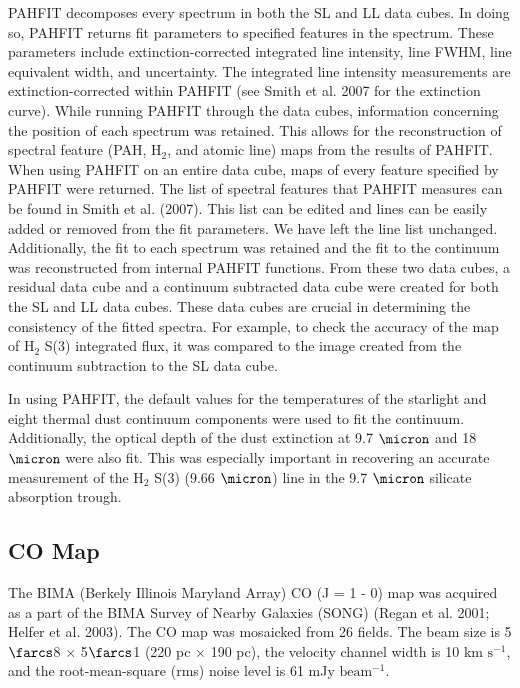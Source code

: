 \documentclass[manuscript]{aastex}
\begin{document}
PAHFIT decomposes every spectrum in both the SL and LL data cubes.  In doing so, PAHFIT returns fit parameters to specified features in the spectrum.  These parameters include extinction-corrected integrated line intensity, line FWHM, line equivalent width, and uncertainty.  The integrated line intensity measurements are extinction-corrected within PAHFIT (see Smith et al. 2007 for the extinction curve).   While running PAHFIT through the data cubes, information concerning the position of each spectrum was retained.  This allows for the reconstruction of spectral feature (PAH, $\mathrm{H_2}$, and atomic line) maps from the results of PAHFIT.  When using PAHFIT on an entire data cube, maps of every feature specified by PAHFIT were returned.  The list of spectral features that PAHFIT measures can be found in Smith et al. (2007).  This list can be edited and lines can be easily added or removed from the fit parameters.  We have left the line list unchanged.  Additionally, the fit to each spectrum was retained and the fit to the continuum was reconstructed from internal PAHFIT functions.  From these two data cubes, a residual data cube and a continuum subtracted data cube were created for both the SL and LL data cubes.  These data cubes are crucial in determining the consistency of the fitted spectra.  For example, to check the accuracy of the map of $\mathrm{H_2}$ S(3) integrated flux, it was compared to the image created from the continuum subtraction to the SL data cube. 

In using PAHFIT, the default values for the temperatures of the starlight and eight thermal dust continuum components were used to fit the continuum.  Additionally, the optical depth of the dust extinction at 9.7 $\micron$ and 18 $\micron$  were also fit.  This was especially important in recovering an accurate measurement of the $\mathrm{H_2}$ S(3) (9.66 $\micron$) line in the 9.7 $\micron$ silicate absorption trough.

\subsection{CO Map}

The BIMA (Berkely Illinois Maryland Array) CO (J = 1 - 0) map was acquired as a part of the BIMA Survey of  Nearby Galaxies (SONG) (Regan et al. 2001; Helfer et al. 2003). The CO map was mosaicked from 26 fields.  The beam size is 5$\farcs$8 $\times$ 5$\farcs$1 (220 pc $\times$ 190 pc), the velocity channel width is 10 km $\mathrm{s^{-1}}$, and the root-mean-square (rms) noise level is 61 mJy $\mathrm{beam^{-1}}$.   
\end{document}
